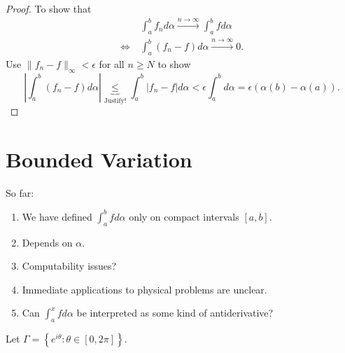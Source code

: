 \documentclass[letterpaper, reqno,11pt]{article}
\begin{document}
\begin{proof}
   To show that
  \begin{align*}
    & \int_a^b f_n d\alpha \xrightarrow{n \to \infty} \int_a^b fd\alpha \\
    \Leftrightarrow ~ & \int_a^b (f_n - f) d\alpha \xrightarrow{n \to \infty} 0.
  \end{align*}
  Use $\lVert f_n - f \rVert_\infty < \epsilon$ for all $n \geq N$ to show
  $$ \left|\int_a^b (f_n - f) d\alpha\right| \underbrace{\leq}_\text{Justify!} \int_a^b |f_n - f| d\alpha < \epsilon \int_a^b d\alpha = \epsilon (\alpha(b) - \alpha(a)). $$
\end{proof}

\section{Bounded Variation}

\begin{remark}
  \normalfont So far:
  \begin{enumerate}
  \item We have defined $\int_a^b fd\alpha$ only on compact intervals $[a, b]$.
  \item Depends on $\alpha$.
  \item Computability issues?
  \item Immediate applications to physical problems are unclear.
  \item Can $\int_a^x fd\alpha$ be interpreted as some kind of antiderivative?
  \end{enumerate}
\end{remark}

 Let $\Gamma = \left\{ e^{i\theta} : \theta \in [0, 2\pi] \right\}$.

\begin{figure}[H]
  \centering
\end{figure}
\end{document}
